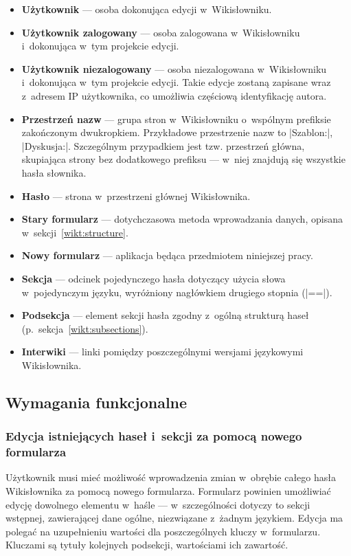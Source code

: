\begin{itemize}
\item \textbf{Użytkownik} --- osoba dokonująca edycji w~Wikisłowniku.
\item \textbf{Użytkownik zalogowany} --- osoba zalogowana w~Wikisłowniku i~dokonująca w~tym projekcie edycji.
\item \textbf{Użytkownik niezalogowany} --- osoba niezalogowana w~Wikisłowniku i~dokonująca w~tym projekcie edycji. Takie edycje zostaną zapisane wraz z~adresem IP użytkownika, co umożliwia częściową identyfikację autora.
\item \textbf{Przestrzeń nazw} --- grupa stron w~Wikisłowniku o~wspólnym prefiksie zakończonym dwukropkiem. Przykładowe przestrzenie nazw to \kod|Szablon:|, \kod|Dyskusja:|. Szczególnym przypadkiem jest tzw. przestrzeń główna, skupiająca strony bez dodatkowego prefiksu --- w~niej znajdują się wszystkie hasła słownika.
\item \textbf{Hasło} --- strona w~przestrzeni głównej Wikisłownika.
\item \textbf{Stary formularz} --- dotychczasowa metoda wprowadzania danych, opisana w~sekcji~\ref{wikt:structure}.
\item \textbf{Nowy formularz} --- aplikacja będąca przedmiotem niniejszej pracy.
\item \textbf{Sekcja} --- odcinek pojedynczego hasła dotyczący użycia słowa w~pojedynczym języku, wyróżniony nagłówkiem drugiego stopnia (\kod|==|).
\item \textbf{Podsekcja} --- element sekcji hasła zgodny z~ogólną strukturą haseł (p.~sekcja~\ref{wikt:subsections}).
\item \textbf{Interwiki} --- linki pomiędzy poszczególnymi wersjami językowymi Wikisłownika.
\end{itemize}

\subsection{Wymagania funkcjonalne}
\subsubsection{Edycja istniejących haseł i~sekcji za pomocą nowego formularza}
Użytkownik musi mieć możliwość wprowadzenia zmian w~obrębie całego hasła Wikisłownika za pomocą nowego formularza. Formularz powinien umożliwiać edycję dowolnego elementu w~haśle --- w~szczególności dotyczy to sekcji wstępnej, zawierającej dane ogólne, niezwiązane z~żadnym językiem. Edycja ma polegać na uzupełnieniu wartości dla poszczególnych kluczy w~formularzu. Kluczami są tytuły kolejnych podsekcji, wartościami ich zawartość.

